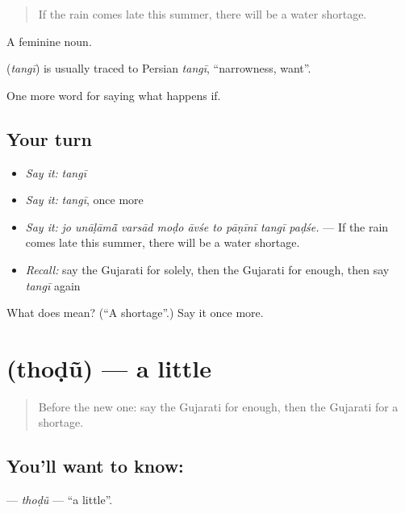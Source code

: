 \begin{quote}
If the rain comes late this summer, there will be a water shortage.
\end{quote}

A feminine noun.

\begin{cousinweb}
\textbf{} (\emph{tangī}) is usually traced to Persian \emph{tangī}, \textquotedblleft{}narrowness, want\textquotedblright{}.
\end{cousinweb}

\begin{grammarlens}[title={What you've built}]
One more word for saying what happens if.
\end{grammarlens}

\subsection*{Your turn}
\begin{itemize}
\raggedright
  \item \emph{Say it:} \emph{tangī}
  \item \emph{Say it:} \emph{tangī}, once more
  \item \emph{Say it:} \emph{jo unāḷāmā̃ varsād moḍo āvśe to pāṇīnī tangī paḍśe.} — If the rain comes late this summer, there will be a water shortage.
  \item \emph{Recall:} say the Gujarati for solely, then the Gujarati for enough, then say \emph{tangī} again
\end{itemize}

\begin{tcolorbox}[breakable,colback=teal!4,colframe=teal!35!black,title={Before you move on}]
What does  mean? (\textquotedblleft{}A shortage\textquotedblright{}.) Say it once more.
\end{tcolorbox}
\section[\texorpdfstring{\gu{થોડું} (thoḍũ)}{થોડું (thoḍũ)}]{ (thoḍũ) — a little}

\label{lesson:GU-C380-thodu}



\begin{quote}
Before the new one: say the Gujarati for enough, then the Gujarati for a shortage.
\end{quote}

\subsection*{You'll want to know: }
\textbf{} — \emph{thoḍũ} — \textquotedblleft{}a little\textquotedblright{}.

